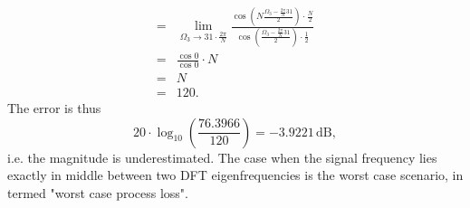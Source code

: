 \documentclass[11pt,a4paper,DIV=12]{scrartcl}
\begin{document}
\begin{Loesung}
\begin{enumerate}[label=\alph*)]
\begin{align}
	=&\lim_{\Omega_3\to31\cdot\frac{2\pi}{N}}\frac{\cos\left(N\frac{\Omega_3-\frac{2\pi}{N}31}{2}\right)\cdot\frac{N}{2}}{\cos\left(\frac{\Omega_3-\frac{2\pi}{N}31}{2}\right)\cdot\frac{1}{2}}\nonumber\\
	=&\frac{\cos0}{\cos0}\cdot N\nonumber\\
	=&N\nonumber\\
	=&120\nonumber.
	\end{align}
%
	The error is thus
	\begin{equation}
	20\cdot\log_{10}\left(\frac{76.3966}{120}\right)=-3.9221\,\text{dB},\nonumber
	\end{equation}
	i.e. the magnitude is underestimated.
	The case when the signal frequency lies exactly in middle between two DFT
	eigenfrequencies is the worst case scenario, in \cite{Harris1978}
	termed "worst case process loss".
\end{enumerate}
\end{Loesung}

%
%

\end{document}
